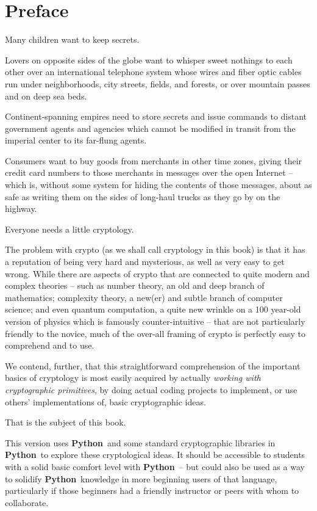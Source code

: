\documentclass[12pt,letterpaper]{amsbook}
\theoremstyle{definition}
\theoremstyle{remark}
\numberwithin{figure}{section}
\numberwithin{exercise}{chapter}
\numberwithin{section}{chapter}
\numberwithin{equation}{section}
\numberwithin{table}{subsection}
\newenvironment{preface}{}{}
\newcommand{\Python}{{\textbf{\ix{Python}}}}
\newcommand{\ix}[1]{{#1}\index{#1}}
\begin{document}
\begin{preface}
  \chapter*{Preface}

  Many children want to keep secrets.
  
  Lovers on opposite sides of the globe want to whisper sweet nothings to each
  other over an international telephone system whose wires and fiber optic
  cables run under neighborhoods, city streets, fields, and forests, or over
  mountain passes and on deep sea beds.

  Continent-spanning empires need to store secrets and issue commands to distant
  government agents and agencies which cannot be modified in transit from the
  imperial center to its far-flung agents.

  Consumers want to buy goods from merchants in other time zones, giving their
  credit card numbers to those merchants in messages over the open Internet --
  which is, without some system for hiding the contents of those messages,
  about as safe as writing them on the sides of long-haul trucks as they go by
  on the highway.

  Everyone needs a little cryptology.

  The problem with crypto (as we shall call cryptology in this book) is that
  it has a reputation of being very hard and mysterious, as well as very easy
  to get wrong.  While there are aspects of crypto that are connected to quite
  modern and complex theories -- such as number theory, an old and deep
  branch of mathematics; complexity theory, a new(er) and subtle branch of
  computer science; and even quantum computation, a quite new wrinkle on a
  100 year-old version of physics which is famously counter-intuitive -- that
  are not particularly friendly to the novice, much of the over-all framing of
  crypto is perfectly easy to comprehend and to use.

  We contend, further, that this straightforward comprehension of the important
  basics of cryptology is most easily acquired by actually \textit{working with
  cryptographic primitives}, by doing actual coding projects to implement, or
  use others' implementations of, basic cryptographic ideas.

  That is the subject of this book.

  This version uses \Python\ and some standard cryptographic libraries in
  \Python\ to explore these cryptological ideas.  It should be accessible to
  students with a solid basic comfort level with \Python\ -- but could also be
  used as a way to solidify \Python\ knowledge in more beginning users of that
  language, particularly if those beginners had a friendly instructor or peers
  with whom to collaborate.
  
\end{preface}
\end{document}
